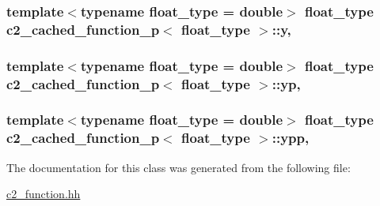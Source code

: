 \subsubsection[{\texorpdfstring{y}{y}}]{\setlength{\rightskip}{0pt plus 5cm}template$<$typename float\+\_\+type  = double$>$ float\+\_\+type {\bf c2\+\_\+cached\+\_\+function\+\_\+p}$<$ float\+\_\+type $>$\+::y\hspace{0.3cm}{\ttfamily [mutable]}, {\ttfamily [protected]}}\hypertarget{classc2__cached__function__p_a0104e340e54e7e0b7da2ac4ed5fce2a8}{}\label{classc2__cached__function__p_a0104e340e54e7e0b7da2ac4ed5fce2a8}
\subsubsection[{\texorpdfstring{yp}{yp}}]{\setlength{\rightskip}{0pt plus 5cm}template$<$typename float\+\_\+type  = double$>$ float\+\_\+type {\bf c2\+\_\+cached\+\_\+function\+\_\+p}$<$ float\+\_\+type $>$\+::yp\hspace{0.3cm}{\ttfamily [mutable]}, {\ttfamily [protected]}}\hypertarget{classc2__cached__function__p_a5e6fa7f5df36abad202ae18c94555cf9}{}\label{classc2__cached__function__p_a5e6fa7f5df36abad202ae18c94555cf9}
\subsubsection[{\texorpdfstring{ypp}{ypp}}]{\setlength{\rightskip}{0pt plus 5cm}template$<$typename float\+\_\+type  = double$>$ float\+\_\+type {\bf c2\+\_\+cached\+\_\+function\+\_\+p}$<$ float\+\_\+type $>$\+::ypp\hspace{0.3cm}{\ttfamily [mutable]}, {\ttfamily [protected]}}\hypertarget{classc2__cached__function__p_aa4c8bb8e2184ba1560aa3c63cb73095a}{}\label{classc2__cached__function__p_aa4c8bb8e2184ba1560aa3c63cb73095a}


The documentation for this class was generated from the following file\+:\begin{DoxyCompactItemize}
\item 
\hyperlink{c2__function_8hh}{c2\+\_\+function.\+hh}\end{DoxyCompactItemize}
